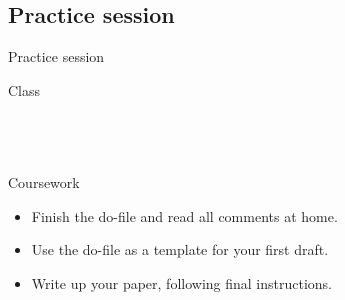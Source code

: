 \documentclass[t]{beamer}
\begin{document}
	\subsection{Practice session}
  
	\begin{frame}[t]{Practice session}

    \begin{block}{Class}
      \\
      \\
      
			\\
			\\    
    \end{block}

    \begin{alertblock}{Coursework}
      \begin{itemize}
	       \item Finish the do-file and read all comments at home.
	       \item Use the do-file as a template for your first draft.
	       \item Write up your paper, following final instructions.
      \end{itemize}
    \end{alertblock}
    		
	\end{frame}
	
\end{document}
